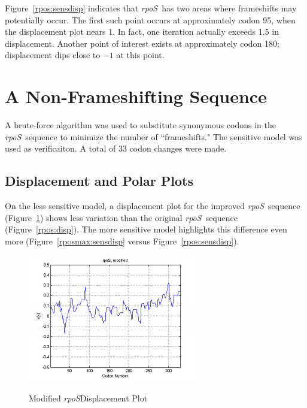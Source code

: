 \documentclass[10pt,twocolumn]{article}
\newcommand{\rpoS}{\emph{rpoS}}
\begin{document}
Figure~\ref{rpos:sensdisp} indicates that \rpoS\ has two areas where frameshifts may potentially occur.
The first such point occurs at approximately codon 95, when the displacement plot nears 1.
In fact, one iteration actually exceeds 1.5 in displacement.
Another point of interest exists at approximately codon 180; displacement dips close to $-1$ at this point.

\section{A Non-Frameshifting Sequence}

A brute-force algorithm was used to substitute synonymous codons in the \rpoS\ sequence to minimize the number of ``frameshifts."
The sensitive model was used as verificaiton.  A total of 33 codon changes were made.

\subsection{Displacement and Polar Plots}

On the less sensitive model, a displacement plot for the improved \rpoS\ sequence (Figure~\ref{rposmax:disp}) shows less variation than the original \rpoS\ sequence (Figure~\ref{rpos:disp}).
The more sensitive model highlights this difference even more (Figure~\ref{rposmax:sensdisp} versus Figure~\ref{rpos:sensdisp}).

\begin{figure}[htp]
    \centering
    \caption{Modified \rpoS Displacement Plot}
    \label{rposmax:disp}
    {\includegraphics[scale=1]{rpoSmax.png}}
\end{figure}
\end{document}

